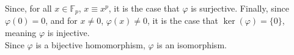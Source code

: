 \documentclass[8pt]{extarticle}
\begin{document}
  Since, for all $x\in \mathbb{F}_p$, $x \equiv x^p$, it is the case that $\varphi$ is surjective. Finally, since $\varphi(0) = 0$, and for $x\neq 0$, $\varphi(x) \neq 0$, it is the case that $\ker(\varphi) = \{0\}$, meaning $\varphi$ is injective.\\

  Since $\varphi$ is a bijective homomorphism, $\varphi$ is an isomorphism.
\end{document}
